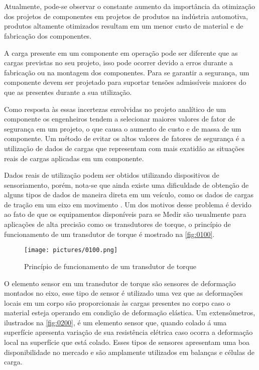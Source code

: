 

\chapter{}

Atualmente, pode-se observar o constante aumento da importância da otimização dos projetos de componentes em projetos de produtos na indústria automotiva, produtos altamente otimizados
resultam em um menor custo de material e de fabricação dos componentes.

A carga presente em um componente em operação pode ser diferente que as cargas previstas no seu projeto, isso pode ocorrer devido a erros durante a fabricação ou na montagem dos componentes.
Para se garantir a segurança, um componente devem ser projetado para suportar tensões admissíveis maiores do que as presentes durante a sua utilização. \autocite{Hibbeler2010}

Como resposta às essas incertezas envolvidas no projeto analítico de um componente os engenheiros tendem a selecionar maiores valores de fator de segurança em um projeto, o que causa o aumento
de custo e de massa de um componente.
Um método de evitar os altos valores de fatores de segurança é a utilização de dados de cargas que representam com mais exatidão as situações reais de cargas aplicadas em um componente.

Dados reais de utilização podem ser obtidos utilizando dispositivos de sensoriamento, porém, nota-se que ainda existe uma dificuldade de obtenção de alguns tipos de dados de maneira direta
em um veículo, como os dados de cargas de tração em um eixo em movimento \autocite{Nurprasetio2018}. Um dos motivos desse problema é devido ao fato de que os equipamentos disponíveis para se
Medir são usualmente para aplicações de alta precisão como os transdutores de torque, o princípio de funcionamento de um transdutor de torque é mostrado na \autoref{fig:0100}.

\begin{figure}[htb]
	\caption{\label{fig:0100} Princípio de funcionamento de um transdutor de torque}
	\begin{center}
		\texttt{[image: pictures/0100.png]}
	\end{center}
\end{figure}


O elemento sensor em um transdutor de torque são sensores de deformação montados no eixo, esse tipo de sensor é utilizado uma vez que as deformações locais em um corpo são proporcionais às
cargas presentes no corpo caso o material esteja operando em condição de deformação elástica.
Um extensômetros, ilustrados na \autoref{fig:0200}, é um elemento sensor que, quando colado á uma superfície apresenta variação de sua resistência elétrica caso ocorra a deformação local na
superfície que está colado.
Esses tipos de sensores apresentam uma boa disponibilidade no mercado e são amplamente utilizados em balanças e células de carga.

